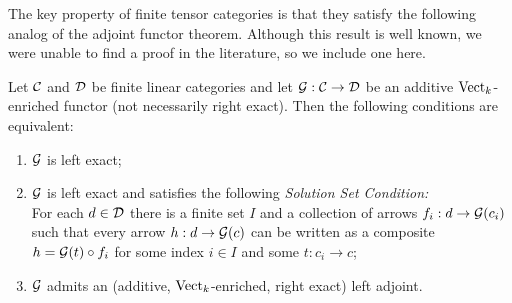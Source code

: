 \documentclass{amsart}
\begin{document}
The key property of finite tensor categories is that they satisfy the following analog of the adjoint functor theorem.  Although this result is well known, we were unable to find a proof in the literature, so we include one here.

\begin{proposition} \label{prop:AFT}
	Let $\mathcal C$ and $\mathcal D$ be finite linear categories and let $\mathcal G: \mathcal C \rightarrow \mathcal D$  be an additive $\mathrm{Vect}_k$-enriched functor (not necessarily right exact). Then the following conditions are equivalent: 
	\begin{enumerate}
		\item $\mathcal G$ is left exact;  
		\item $\mathcal G$ is left exact and satisfies the following {\em Solution Set Condition:} \\  For each $d \in \mathcal D$ there is a finite set $I$ and a collection of arrows $f_i:d \to \mathcal G(c_i)$ such that every arrow $h:d \to \mathcal G(c)$ can be written as a composite $h = \mathcal G(t) \circ f_i$ for some index $i \in I$ and some $t: c_i \to c$; 
		\item $\mathcal G$ admits an (additive, ${\mathrm{Vect}_k}$-enriched, right exact) left adjoint.
	\end{enumerate}
\end{proposition}
\end{document}
